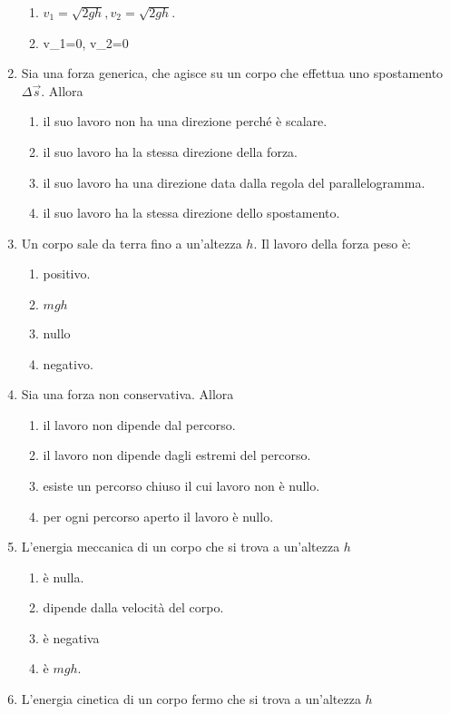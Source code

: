 \documentclass{article}
\begin{document}
\begin{enumerate}
\begin{enumerate}[label=\Alph*.]
    \item $v_1=\sqrt{2gh}, v_2=\sqrt{2gh}$.
    \item v_1=0, v_2=0
  \end{enumerate}
  \item Sia  una forza generica, che agisce su un corpo che effettua uno spostamento $\Delta \vec{s}$. Allora
  \begin{enumerate}[label=\Alph*.]
    \item il suo lavoro non ha una direzione perché è scalare.
    \item il suo lavoro ha la stessa direzione della forza.
    \item il suo lavoro ha una direzione data dalla regola del parallelogramma.
    \item il suo lavoro ha la stessa direzione dello spostamento.
  \end{enumerate}
  \item Un corpo sale da terra fino a un'altezza $h$. Il lavoro della forza peso è:
  \begin{enumerate}[label=\Alph*.]
    \item positivo.
    \item $mgh$
    \item nullo
    \item negativo.
  \end{enumerate}
  \item Sia  una forza non conservativa. Allora
  \begin{enumerate}[label=\Alph*.]
    \item il lavoro non dipende dal percorso.
    \item il lavoro non dipende dagli estremi del percorso.
    \item esiste un percorso chiuso il cui lavoro non è nullo.
    \item per ogni percorso aperto il lavoro è nullo.
  \end{enumerate}
  \item L'energia meccanica di un corpo che si trova a un'altezza $h$
  \begin{enumerate}[label=\Alph*.]
    \item è nulla.
    \item dipende dalla velocità del corpo.
    \item è negativa
    \item è $mgh$.
  \end{enumerate}
  \item L'energia cinetica di un corpo fermo che si trova a un'altezza $h$

\end{enumerate}
\end{document}
